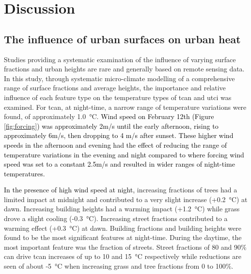 \documentclass[final,3p,times,authoryear]{elsarticle}
\newcommand{\add}[1]{\textcolor{black}{#1}}
\begin{document}
\section{Discussion}\label{sec:discussion}

\subsection{The influence of urban surfaces on urban heat}\label{sec:discinfluence}
Studies providing a systematic examination of the influence of varying surface fractions and urban heights are rare and generally based on remote sensing data. In this study, through systematic micro-climate modelling of a comprehensive range of surface fractions and average heights, the importance and relative influence of each feature type on the temperature types of \gls{tcan} and \gls{utci} was examined. For \gls{tcan}, at night-time, a narrow range of temperature variations were found, of approximately 1.0\SI{}{\degreeCelsius}. \add{Wind speed on February 12th (Figure \ref{fig:forcing}) was approximately 2m/s until the early afternoon, rising to approximately 6m/s, then dropping to 4 m/s after sunset. These higher wind speeds in the afternoon and evening had the effect of reducing the range of temperature variations in the evening and night compared to \cite{Stewart2021} where forcing wind speed was set to a constant 2.5m/s and resulted in wider ranges of night-time temperatures.} 

\add{In the presence of high wind speed at night,} increasing fractions of trees had a limited impact at midnight and contributed to a very slight increase (+0.2\SI{}{\degreeCelsius}) at dawn. Increasing building heights had a warming impact (+1.2\SI{}{\degreeCelsius}) while grass drove a slight cooling (-0.3\SI{}{\degreeCelsius}). Increasing street fractions contributed to a warming effect (+0.3\SI{}{\degreeCelsius}) at dawn. Building fractions and building heights were found to be the most significant features at night-time. During the daytime, the most important feature was the fraction of streets. Street fractions of 80 and 90\% can drive \gls{tcan} increases of up to 10 and 15\SI{}{\degreeCelsius} respectively while reductions are seen of about -5\SI{}{\degreeCelsius} when increasing grass and tree fractions from 0 to 100\%. 
\end{document}
